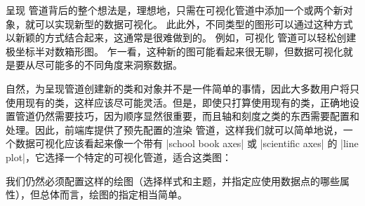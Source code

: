 呈现 管道背后的整个想法是，理想地，只需在可视化管道中添加一个或两个新对象，就可以实现新型的数据可视化。 此此外，不同类型的图形可以通过这种方式以新颖的方式结合起来，这通常是很难做到的。 例如，可视化 管道可以轻松创建极坐标半对数箱形图。 乍一看，这种新的图可能看起来很无聊，但数据可视化就是要从尽可能多的不同角度来洞察数据。


自然，为呈现管道创建新的类和对象并不是一件简单的事情，因此大多数用户将只使用现有的类，这样应该尽可能灵活。但是，即使只打算使用现有的类，正确地设置管道仍然需要技巧，因为顺序显然很重要，而且轴和刻度之类的东西需要配置和处理。因此，前端库提供了预先配置的渲染 管道，这样我们就可以简单地说，一个数据可视化应该看起来像一个带有 |school book axes| 或 |scientific axes| 的 |line plot|，它选择一个特定的可视化管道，适合这类图：

%
\begin{codeexample}[preamble={\usetikzlibrary{datavisualization.formats.functions}}]
\end{codeexample}
%
\begin{codeexample}[preamble={\usetikzlibrary{datavisualization.formats.functions}}]
\end{codeexample}
%

我们仍然必须配置这样的绘图（选择样式和主题，并指定应使用数据点的哪些属性），但总体而言，绘图的指定相当简单。

\clearpage

